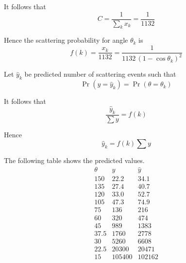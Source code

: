 It follows that
\begin{equation*}
C=\frac{1}{\sum_k x_k}=\frac{1}{1132}
\end{equation*}

Hence the scattering probability for angle $\theta_k$ is
\begin{equation*}
f(k)=\frac{x_k}{1132}=\frac{1}{1132\,(1-\cos\theta_k)^2}
\end{equation*}

Let $\hat y_k$ be predicted number of scattering events such that
\begin{equation*}
\Pr(y=\hat y_k)=\Pr(\theta=\theta_k)
\end{equation*}

It follows that
\begin{equation*}
\frac{\hat y_k}{\sum y}=f(k)
\end{equation*}

Hence
\begin{equation*}
\hat y_k=f(k)\sum y
\end{equation*}

The following table shows the predicted values.
\begin{equation*}
\begin{matrix}
\theta & y & \hat y\\
150 & 22.2 & 34.1\\
135 & 27.4 & 40.7\\
120 & 33.0 & 52.7\\
105 & 47.3 & 74.9\\
75 & 136 & 216\\
60 & 320 & 474\\
45 & 989 & 1383\\
37.5 & 1760 & 2778\\
30 & 5260 & 6608\\
22.5 & 20300 & 20471\\
15 & 105400 & 102162
\end{matrix}
\end{equation*}

\iffalse

The coefficient of determination $R^2$ measures how well predicted values fit the data.
\begin{equation*}
R^2=1-\frac{\sum (y-\hat y)^2}{\sum (y-\bar y)^2}=0.998
\end{equation*}

The result indicates that $d\sigma$ explains 99.8\%
of the variance in the data.

\fi


